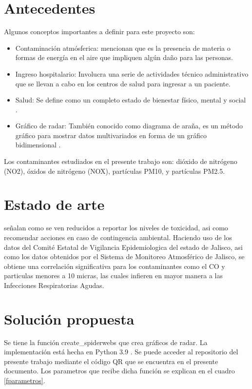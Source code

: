 \documentclass[a0]{sciposter} %
\begin{document}
\begin{multicols}{2}
\section{Antecedentes}

Algunos conceptos importantes a definir para este proyecto son:

\begin{itemize}
    \item Contaminación atmósferica: \citet{bib4} mencionan que es la presencia de materia o formas de energía en el aire que impliquen algún daño para las personas.
    \item Ingreso hospitalario: Involucra una serie de actividades técnico administrativo que se llevan a cabo en los centros de salud para ingresar a un paciente.
    \item Salud: Se define como un completo estado de bienestar físico, mental y social \citep{bib3}.
    \item Gráfico de radar: También conocido como diagrama de araña, es un método gráfico para mostrar datos multivariados en forma de un gráfico bidimensional \citep{bib5}.  
\end{itemize}

Los contaminantes estudiados en el presente trabajo son: dióxido de nitrógeno (NO2), óxidos de nitrógeno (NOX), partículas PM10, y partículas PM2.5.

\section{Estado de arte}

\citet{bib1} señalan como se ven reducidos a reportar los niveles de toxicidad, asi como recomendar acciones en caso de contingencia ambiental. Haciendo uso de los datos del Comité Estatal de Vigilancia Epidemiologica del estado de Jalisco, asi como los datos obtenidos por el Sistema de Monitoreo Atmosférico de Jalisco, se obtiene una correlación significativa para los contaminantes como el CO y particulas menores a 10 micras, las cuales infieren en mayor manera a las Infecciones Respiratorias Agudas. 

\section{Solución propuesta}

Se tiene la función create\_spiderwebs que crea gráficos de radar. La implementación está hecha en Python 3.9 \citep{python}. Se puede acceder al repositorio del presente trabajo mediante el código QR que se encuentra en el presente documento. Los parametros que recibe dicha función se explican en el cuadro \ref{fparametros}. 


\end{multicols}
\end{document}
